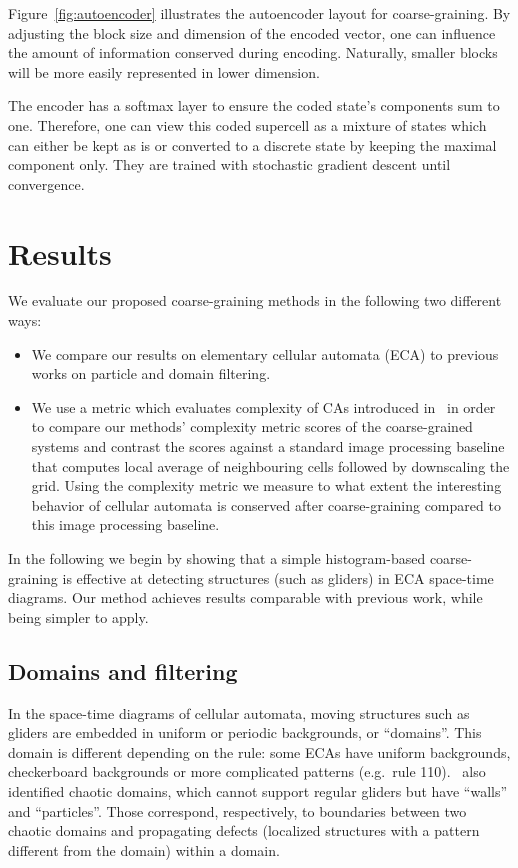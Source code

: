 Figure~\ref{fig:autoencoder} illustrates the autoencoder layout for
coarse-graining. By adjusting the block size and dimension of the encoded
vector, one can influence the amount of information conserved during encoding.
Naturally, smaller blocks will be more easily represented in lower dimension.

The encoder has a softmax layer to ensure the coded state's components sum to
one. Therefore, one can view this coded supercell as a mixture of states which
can either be kept as is or converted to a discrete state by keeping the maximal
component only. They are trained with stochastic gradient descent until
convergence.

\section{\label{sec:results}Results}

We evaluate our proposed coarse-graining methods in the following two different ways:
\begin{itemize}
\item We compare our results on elementary cellular automata (ECA) to previous
  works on particle and domain filtering.
\item We use a metric which evaluates complexity of CAs introduced
  in~\cite{cisnerosEvolvingStructuresComplex2019} in order to compare our
  methods' complexity metric scores of the coarse-grained systems and contrast
  the scores against a standard image processing baseline that computes local
  average of neighbouring cells followed by downscaling the grid. Using the
  complexity metric we measure to what extent the interesting behavior of
  cellular automata is conserved after coarse-graining compared to this image
  processing baseline.
\end{itemize}

In the following we begin by showing that a simple histogram-based
coarse-graining is effective at detecting structures (such as gliders) in ECA
space-time diagrams. Our method achieves results comparable with previous work,
while being simpler to apply.

\subsection{Domains and filtering}

In the space-time diagrams of cellular automata, moving structures such as
gliders are embedded in uniform or periodic backgrounds, or ``domains''. This
domain is different depending on the rule: some ECAs have uniform backgrounds,
checkerboard backgrounds or more complicated patterns (e.g.\ rule
110).~\cite{crutchfieldTurbulentPatternBases1993} also identified chaotic
domains, which cannot support regular gliders but have ``walls'' and
``particles''. Those correspond, respectively, to boundaries between two chaotic
domains and propagating defects (localized structures with a pattern different
from the domain) within a domain.

